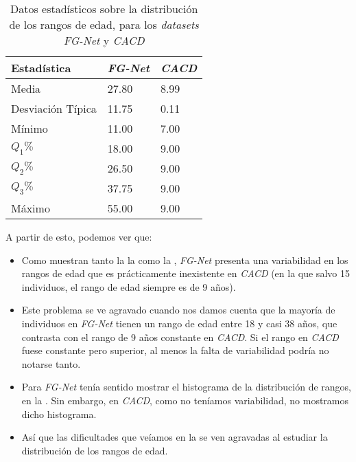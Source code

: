 \begin{table}[!h]
\centering
\begin{tabular}{|l|l|l|}
    \hline
    \textbf{Estadística} & \textbf{\textit{FG-Net}} & \textbf{\textit{CACD}} \\
    \hline

    Media             & 27.80 & 8.99 \\
    Desviación Típica & 11.75 & 0.11 \\
    Mínimo            & 11.00 & 7.00 \\
    $Q_1 \%$          & 18.00 & 9.00 \\
    $Q_2 \%$          & 26.50 & 9.00 \\
    $Q_3 \%$          & 37.75 & 9.00 \\
    Máximo            & 55.00 & 9.00 \\

    \hline

\end{tabular}
\caption{Datos estadísticos sobre la distribución de los rangos de edad, para los \textit{datasets} \textit{FG-Net} y \textit{CACD}}
    \label{table:conjunta_fgnet_estadisticas_rangos_edad}
\end{table}

A partir de esto, podemos ver que:

\begin{itemize}
    \item Como muestran tanto la la  como la , \textit{FG-Net} presenta una variabilidad en los rangos de edad que es prácticamente inexistente en \textit{CACD} (en la que salvo 15 individuos, el rango de edad siempre es de 9 años).
    \item Este problema se ve agravado cuando nos damos cuenta que la mayoría de individuos en \textit{FG-Net} tienen un rango de edad entre 18 y casi 38 años, que contrasta con el rango de 9 años constante en \textit{CACD}. Si el rango en \textit{CACD} fuese constante pero superior, al menos la falta de variabilidad podría no notarse tanto.
    \item Para \textit{FG-Net} tenía sentido mostrar el histograma de la distribución de rangos, en la . Sin embargo, en \textit{CACD}, como no teníamos variabilidad, no mostramos dicho histograma.
    \item Así que las dificultades que veíamos en la  se ven agravadas al estudiar la distribución de los rangos de edad.
\end{itemize}

